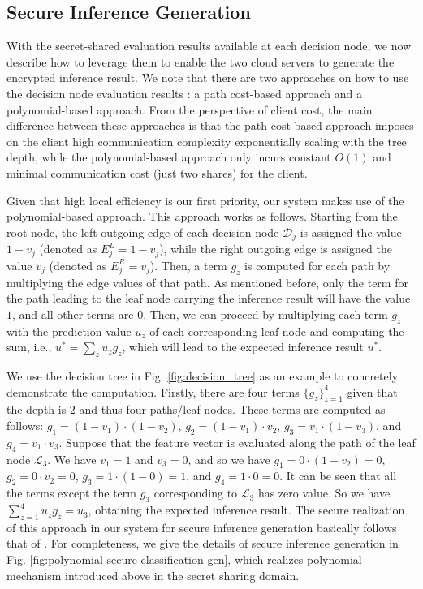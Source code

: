 \documentclass[10pt,journal,compsoc]{IEEEtran}
\begin{document}
\subsection{Secure Inference Generation}


With the secret-shared evaluation results available at each decision node, we now describe how to leverage them to enable the two cloud servers to generate the encrypted inference result.
%
We note that there are two approaches on how to use the decision node evaluation results \cite{ZhengDWWN20}: a path cost-based approach and a polynomial-based approach.
%
From the perspective of client cost, the main difference between these approaches is that the path cost-based approach imposes on the client high communication complexity exponentially scaling with the tree depth, while the polynomial-based approach only incurs constant $O(1)$ and minimal communication cost (just two shares) for the client. 
%


Given that high local efficiency is our first priority, our system makes use of the polynomial-based approach.
%
This approach works as follows.
%
Starting from the root node, the left outgoing edge of each decision node $\mathcal{D}_j$ is assigned the value $1-v_j$ (denoted as $E^L_{j}=1-v_j$), while the right outgoing edge is assigned the value $v_j$ (denoted as $E^R_{j}=v_j$).
%
Then, a term $g_z$ is computed for each path by multiplying the edge values of that path.
% 
As mentioned before, only the term for the path leading to the leaf node carrying the inference result will have the value $1$, and all other terms are $0$.
%
Then, we can proceed by multiplying each term $g_z$ with the prediction value $u_z$ of each corresponding leaf node and computing the sum, i.e., $u^*  = \sum\nolimits_z {u_z g_z }$, which will lead to the expected inference result $u^*$.

We use the decision tree in Fig. \ref{fig:decision_tree} as an example to concretely demonstrate the computation.
%
Firstly, there are four terms $\{g_z\}^4_{z=1}$ given that the depth is $2$ and thus four paths/leaf nodes.
%
These terms are computed as follows: $g_1=(1-v_1)\cdot (1-v_2)$, $g_2=(1-v_1)\cdot v_2$, $g_3=v_1\cdot (1-v_3)$, and $g_4=v_1\cdot v_3$.
%
Suppose that the feature vector is evaluated along the path of the leaf node $\mathcal{L}_3$. 
%
We have $v_1=1$ and $v_3=0$, and so we have $g_1=0 \cdot (1-v_2)=0$, $g_2=0 \cdot v_2=0$, $g_3= 1\cdot (1-0)=1$, and $g_4=1\cdot 0=0$.
%
It can be seen that all the terms except the term $g_3$ corresponding to $\mathcal{L}_3$ has zero value.
%
So we have $\sum\nolimits^4_{z=1} {u_z g_z }=u_3$, obtaining the expected inference result.
%
The secure realization of this approach in our system for secure inference generation basically follows that of \cite{ZhengDWWN20}.
%
For completeness, we give the details of secure inference generation in Fig. \ref{fig:polynomial-secure-classification-gen}, which realizes polynomial mechanism introduced above in the secret sharing domain. 
%
\end{document}
